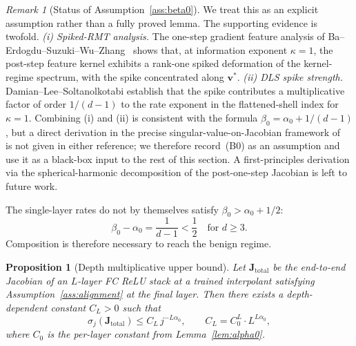 \documentclass[12pt]{amsart}
\newtheorem{proposition}[theorem]{Proposition}
\theoremstyle{definition}
\theoremstyle{remark}
\newtheorem{remark}[theorem]{Remark}
\newcommand{\bJ}{\mathbf{J}}
\newcommand{\bv}{\mathbf{v}}
\begin{document}
\begin{remark}[Status of Assumption~\ref{ass:beta0}]\label{rem:beta0-status}
We treat this as an explicit assumption rather than a fully proved
lemma. The supporting evidence is twofold.
\emph{(i) Spiked-RMT analysis.} The one-step gradient feature analysis
of Ba--Erdogdu--Suzuki--Wu--Zhang~\cite{ba2022mei} shows that, at
information exponent $\kappa = 1$, the post-step feature kernel
exhibits a rank-one spiked deformation of the kernel-regime spectrum,
with the spike concentrated along $\bv^{*}$.
\emph{(ii) DLS spike strength.} Damian--Lee--Soltanolkotabi
\cite{DLS2022} establish that the spike contributes a multiplicative
factor of order $1/(d-1)$ to the rate exponent in the
flattened-shell index for $\kappa = 1$. Combining (i) and (ii) is
consistent with the formula $\beta_{0} = \alpha_{0} + 1/(d-1)$, but a
direct derivation in the precise singular-value-on-Jacobian framework
of~\cite{paperA} is not given in either reference; we therefore
record~(B0) as an assumption and use it as a black-box input to the
rest of this section. A first-principles derivation via the
spherical-harmonic decomposition of the post-one-step Jacobian is left
to future work.
\end{remark}

The single-layer rates do not by themselves satisfy
$\beta_{0} > \alpha_{0} + 1/2$:
\[
  \beta_{0} - \alpha_{0} = \frac{1}{d-1} < \frac{1}{2}
  \quad \text{for } d \geq 3.
\]
Composition is therefore necessary to reach the benign regime.

\begin{proposition}[Depth multiplicative upper bound]\label{prop:depth-mult}
Let $\bJ_{\mathrm{total}}$ be the end-to-end Jacobian of an $L$-layer FC
ReLU stack at a trained interpolant satisfying
Assumption~\ref{ass:alignment} at the final layer. Then there exists a
depth-dependent constant $C_{L} > 0$ such that
\[
  \sigma_{j}(\bJ_{\mathrm{total}}) \leq C_{L}\, j^{-L\alpha_{0}},
  \qquad C_{L} = C_{0}^{L} \cdot L^{L\alpha_{0}},
\]
where $C_{0}$ is the per-layer constant from Lemma~\ref{lem:alpha0}.
\end{proposition}
\end{document}
